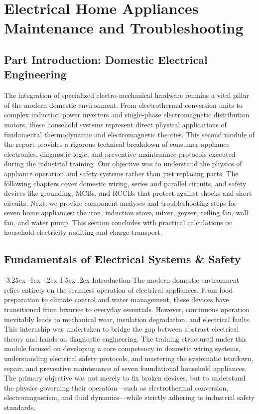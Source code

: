 \documentclass[11pt,a4paper]{report}
\makeatletter
\renewcommand{\section}{\@startsection{section}{1}{\z@}%
  {-3.25ex \@plus -1ex \@minus -.2ex}%
  {1.5ex \@plus.2ex}%
  {\normalfont\Large\bfseries\color{primaryColor}}}
\makeatother
\begin{document}
\part{Electrical Home Appliances Maintenance and Troubleshooting}
\chapter*{Part Introduction: Domestic Electrical Engineering}
The integration of specialized electro-mechanical hardware remains a vital pillar of the modern domestic environment. From electrothermal conversion units to complex induction power inverters and single-phase electromagnetic distribution motors, these household systems represent direct physical applications of fundamental thermodynamic and electromagnetic theories. This second module of the report provides a rigorous technical breakdown of consumer appliance electronics, diagnostic logic, and preventive maintenance protocols executed during the industrial training. Our objective was to understand the physics of appliance operation and safety systems rather than just replacing parts. The following chapters cover domestic wiring, series and parallel circuits, and safety devices like grounding, MCBs, and RCCBs that protect against shocks and short circuits. Next, we provide component analyses and troubleshooting steps for seven home appliances: the iron, induction stove, mixer, geyser, ceiling fan, wall fan, and water pump. This section concludes with practical calculations on household electricity auditing and charge transport.
\chapter{Fundamentals of Electrical Systems \& Safety}
\section{Introduction}
The modern domestic environment relies entirely on the seamless operation of electrical appliances. From food preparation to climate control and water management, these devices have transitioned from luxuries to everyday essentials. However, continuous operation inevitably leads to mechanical wear, insulation degradation, and electrical faults. This internship was undertaken to bridge the gap between abstract electrical theory and hands-on diagnostic engineering. The training structured under this module focused on developing a core competency in domestic wiring systems, understanding electrical safety protocols, and mastering the systematic teardown, repair, and preventive maintenance of seven foundational household appliances. The primary objective was not merely to fix broken devices, but to understand the physics governing their operation—such as electrothermal conversion, electromagnetism, and fluid dynamics—while strictly adhering to industrial safety standards.
\end{document}
